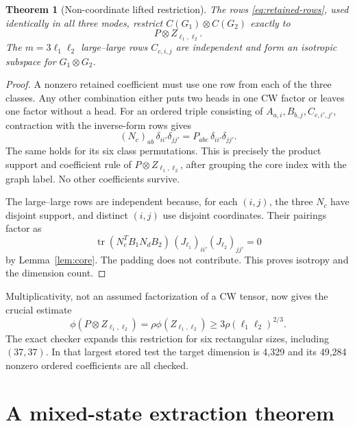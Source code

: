 \documentclass[11pt]{article}
\newtheorem{theorem}{Theorem}[section]
\theoremstyle{definition}\newtheorem{definition}[theorem]{Definition}
\theoremstyle{remark}\newtheorem{remark}[theorem]{Remark}
\newcommand{\tr}{\operatorname{tr}}
\begin{document}
\begin{theorem}[Non-coordinate lifted restriction]\label{thm:retention}
The rows \eqref{eq:retained-rows}, used identically in all three modes, restrict $C(G_1)\otimes C(G_2)$ exactly to
\begin{equation}\label{eq:literal-PZ}
 P\otimes Z_{\ell_1,\ell_2}.
\end{equation}
The $m=3\ell_1\ell_2$ large--large rows $C_{c,i,j}$ are independent and form an isotropic subspace for $G_1\otimes G_2$.
\end{theorem}
\begin{proof}
A nonzero retained coefficient must use one row from each of the three classes. Any other combination either puts two heads in one CW factor or leaves one factor without a head. For an ordered triple consisting of $A_{a,i},B_{b,j},C_{c,i',j'}$, contraction with the inverse-form rows gives
\[
 (N_c)_{ab}\,\delta_{ii'}\delta_{jj'}=P_{abc}\,\delta_{ii'}\delta_{jj'}.
\]
The same holds for its six class permutations. This is precisely the product support and coefficient rule of $P\otimes Z_{\ell_1,\ell_2}$, after grouping the core index with the graph label. No other coefficients survive.

The large--large rows are independent because, for each $(i,j)$, the three $N_c$ have disjoint support, and distinct $(i,j)$ use disjoint coordinates. Their pairings factor as
\[
 \tr(N_c^TB_1N_dB_2)\,(J_{\ell_1})_{ii'}(J_{\ell_2})_{jj'}=0
\]
by Lemma~\ref{lem:core}. The padding does not contribute. This proves isotropy and the dimension count.
\end{proof}

Multiplicativity, not an assumed factorization of a CW tensor, now gives the crucial estimate
\begin{equation}\label{eq:retained-value}
 \phi(P\otimes Z_{\ell_1,\ell_2})
 =\rho\phi(Z_{\ell_1,\ell_2})
 \geq3\rho(\ell_1\ell_2)^{2/3}.
\end{equation}
The exact checker expands this restriction for six rectangular sizes, including $(37,37)$. In that largest stored test the target dimension is 4,329 and its 49,284 nonzero ordered coefficients are all checked.

\section{A mixed-state extraction theorem}\label{sec:mixed}
\end{document}
